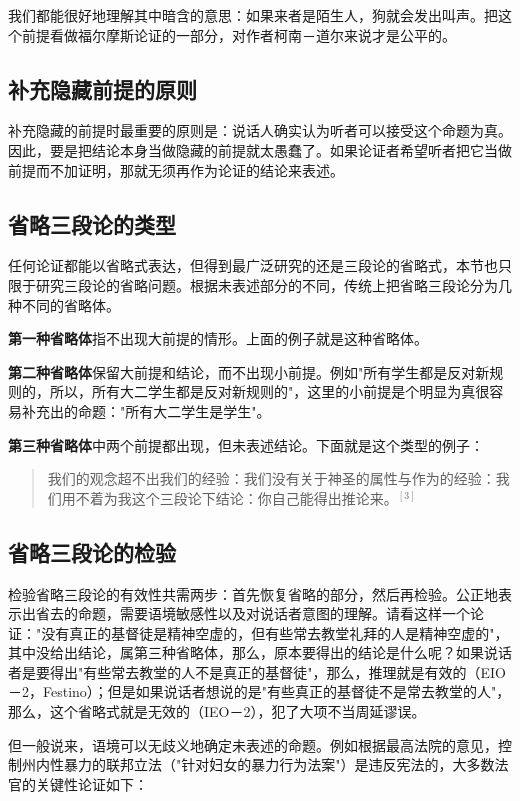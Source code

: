 我们都能很好地理解其中暗含的意思：如果来者是陌生人，狗就会发出叫声。把这个前提看做福尔摩斯论证的一部分，对作者柯南－道尔来说才是公平的。

\subsection{补充隐藏前提的原则}

补充隐藏的前提时最重要的原则是：说话人确实认为听者可以接受这个命题为真。因此，要是把结论本身当做隐藏的前提就太愚蠢了。如果论证者希望听者把它当做前提而不加证明，那就无须再作为论证的结论来表述。

\subsection{省略三段论的类型}

任何论证都能以省略式表达，但得到最广泛研究的还是三段论的省略式，本节也只限于研究三段论的省略问题。根据未表述部分的不同，传统上把省略三段论分为几种不同的省略体。

\textbf{第一种省略体}指不出现大前提的情形。上面的例子就是这种省略体。

\textbf{第二种省略体}保留大前提和结论，而不出现小前提。例如"所有学生都是反对新规则的，所以，所有大二学生都是反对新规则的"，这里的小前提是个明显为真很容易补充出的命题："所有大二学生是学生"。

\textbf{第三种省略体}中两个前提都出现，但未表述结论。下面就是这个类型的例子：

\begin{quote}
我们的观念超不出我们的经验：我们没有关于神圣的属性与作为的经验：我们用不着为我这个三段论下结论：你自己能得出推论来。${ }^{[3]}$
\end{quote}

\subsection{省略三段论的检验}

检验省略三段论的有效性共需两步：首先恢复省略的部分，然后再检验。公正地表示出省去的命题，需要语境敏感性以及对说话者意图的理解。请看这样一个论证："没有真正的基督徒是精神空虚的，但有些常去教堂礼拜的人是精神空虚的"，其中没给出结论，属第三种省略体，那么，原本要得出的结论是什么呢？如果说话者是要得出"有些常去教堂的人不是真正的基督徒"，那么，推理就是有效的（EIO－2，Festino）；但是如果说话者想说的是"有些真正的基督徒不是常去教堂的人"，那么，这个省略式就是无效的（IEO－2），犯了大项不当周延谬误。

但一般说来，语境可以无歧义地确定未表述的命题。例如根据最高法院的意见，控制州内性暴力的联邦立法（"针对妇女的暴力行为法案"）是违反宪法的，大多数法官的关键性论证如下：

